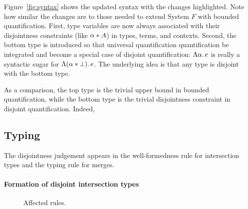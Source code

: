 Figure~\ref{fig:syntax} shows the updated syntax with the changes highlighted.
Note how similar the changes are to those needed to extend System $F$ with
bounded quantification. First, type variables are now always associated with
their disjointness constraints (like $\alpha * A$) in types, terms, and
contexts. Second, the bottom type is introduced so that universal quantification
quantification be integrated and become a special case of disjoint
quantification: $\Lambda \alpha.\, e$ is really a syntactic sugar for $\Lambda (\alpha * \bot).\, e$. The underlying idea is that any type is disjoint
with the bottom type.

As a comparison, the top type is the trivial upper bound in bounded
quantification, while the bottom type is the trivial disjointness constraint in
disjoint quantification. Indeed, 

\subsection{Typing}

The disjointness judgement appears in the well-formedness rule for intersection
types and the typing rule for merges.

\paragraph{Formation of disjoint intersection types}

\begin{figure*}



  \label{fig:fi-patch}
  \caption{Affected rules.}
\end{figure*}

